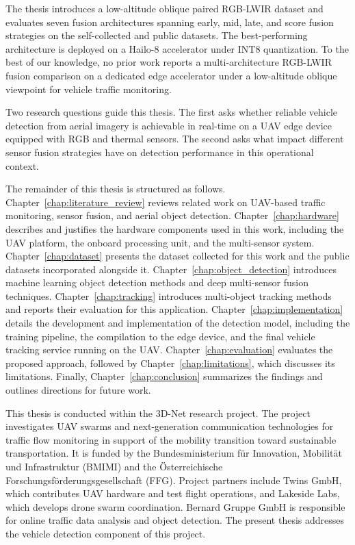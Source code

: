 \documentclass[12pt,oneside,bibtotoc,liststotoc]{scrbook}
\begin{document}
The thesis introduces a low-altitude oblique paired RGB-LWIR dataset and
evaluates seven fusion architectures spanning early, mid, late,
and score fusion strategies on the self-collected and public datasets.
The best-performing architecture
is deployed on a Hailo-8 accelerator under INT8 quantization. To the best of
our knowledge, no prior work reports a multi-architecture RGB-LWIR fusion
comparison on a dedicated edge accelerator under a low-altitude oblique
viewpoint for vehicle traffic monitoring.

Two research questions guide this thesis. The first asks whether reliable
vehicle detection from aerial imagery is achievable in real-time on a UAV edge
device equipped with RGB and thermal sensors. The second asks what impact
different sensor fusion strategies have on detection performance in this
operational context.

The remainder of this thesis is structured as follows.
Chapter~\ref{chap:literature_review} reviews related work on UAV-based
traffic monitoring, sensor fusion, and aerial object detection.
Chapter~\ref{chap:hardware} describes and justifies the hardware components used in this
work, including the UAV platform, the onboard processing unit, and the
multi-sensor system.
Chapter~\ref{chap:dataset} presents the dataset collected for this work and
the public datasets incorporated alongside it.
Chapter~\ref{chap:object_detection} introduces machine learning object
detection methods and deep multi-sensor fusion techniques.
Chapter~\ref{chap:tracking} introduces multi-object tracking methods and
reports their evaluation for this application.
Chapter~\ref{chap:implementation} details the development and implementation
of the detection model, including the training pipeline, the compilation to
the edge device, and the final vehicle tracking service running on the UAV.
Chapter~\ref{chap:evaluation} evaluates the proposed approach, followed by
Chapter~\ref{chap:limitations}, which discusses its limitations.
Finally, Chapter~\ref{chap:conclusion} summarizes the findings and outlines
directions for future work.

This thesis is conducted within the 3D-Net research project. The project
investigates UAV swarms and next-generation communication technologies for
traffic flow monitoring in support of the mobility transition toward sustainable
transportation. It is funded by the Bundesministerium für Innovation,
Mobilität und Infrastruktur (BMIMI) and the Österreichische
Forschungsförderungsgesellschaft (FFG). Project partners include Twins GmbH,
which contributes UAV hardware and test flight operations, and Lakeside Labs,
which develops drone swarm coordination. Bernard Gruppe GmbH is responsible
for online traffic data analysis and object detection. The present thesis
addresses the vehicle detection component of this project.
\end{document}
